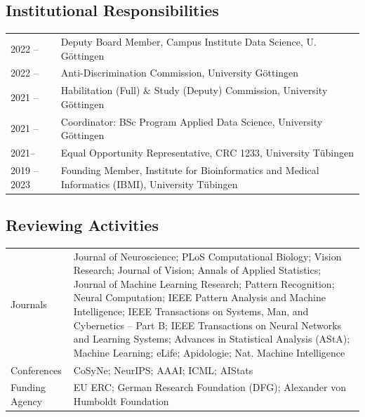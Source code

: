 \documentclass[COG,11pt]{ercgrant}
\begin{document}
\subsection{Institutional Responsibilities}
\begin{tabular}{p{3cm}p{12cm}}
2022 -- & Deputy Board Member, Campus Institute Data Science, U. Göttingen\\
2022 -- & Anti-Discrimination Commission, University Göttingen\\
2021 -- & Habilitation (Full) \& Study (Deputy) Commission, University Göttingen\\
2021 -- & Coordinator: BSc Program Applied Data Science, University Göttingen\\
2021-- & Equal Opportunity Representative, CRC 1233, University T{\"u}bingen\\
2019 -- 2023 & Founding Member, Institute for Bioinformatics and Medical Informatics (IBMI), University T{\"u}bingen \\
\end{tabular}

\subsection{Reviewing Activities}
\begin{tabular}{p{3cm}p{12cm}}
Journals & Journal of Neuroscience; PLoS Computational Biology; Vision Research; Journal of Vision; Annals of Applied Statistics; Journal of Machine Learning Research; Pattern Recognition; Neural Computation; IEEE Pattern Analysis and Machine Intelligence; IEEE Transactions on Systems, Man, and Cybernetics – Part B; IEEE Transactions on Neural Networks and Learning Systems; Advances in Statistical Analysis (AStA); Machine Learning; eLife; Apidologie; Nat. Machine Intelligence\\
Conferences & CoSyNe; NeurIPS; AAAI; ICML; AIStats\\
Funding Agency & EU ERC; German Research Foundation (DFG); Alexander von Humboldt Foundation\\
\end{tabular}
\end{document}
